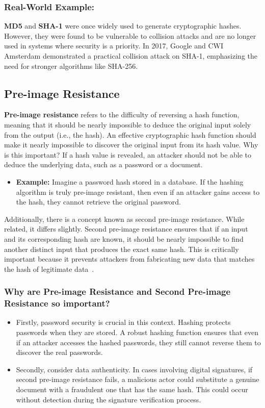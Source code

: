 \documentclass[11pt,a4paper]{article}
\begin{document}
        \subsubsection*{Real-World Example:}
        \textbf{MD5} and \textbf{SHA-1} were once widely used to generate cryptographic hashes. However, they were found to be vulnerable to collision attacks and are no longer used in systems where security is a priority. In 2017, Google and CWI Amsterdam demonstrated a practical collision attack on SHA-1, emphasizing the need for stronger algorithms like SHA-256.
        
    \subsection*{Pre-image Resistance}
    \textbf{Pre-image resistance} refers to the difficulty of reversing a hash function, meaning that it should be nearly impossible to deduce the original input solely from the output (i.e., the hash). An effective cryptographic hash function should make it nearly impossible to discover the original input from its hash value. Why is this important? If a hash value is revealed, an attacker should not be able to deduce the underlying data, such as a password or a document.
        \begin{itemize}
            \item \textbf{Example:} Imagine a password hash stored in a database. If the hashing algorithm is truly pre-image resistant, then even if an attacker gains access to the hash, they cannot retrieve the original password.

        \end{itemize}

    Additionally, there is a concept known as second pre-image resistance. While related, it differs slightly. Second pre-image resistance ensures that if an input and its corresponding hash are known, it should be nearly impossible to find another distinct input that produces the exact same hash. This is critically important because it prevents attackers from fabricating new data that matches the hash of legitimate data~\cite{Preimage}.

        \subsubsection*{Why are Pre-image Resistance and Second Pre-image Resistance so important?}
            \begin{itemize}
                \item Firstly, password security is crucial in this context. Hashing protects passwords when they are stored. A robust hashing function ensures that even if an attacker accesses the hashed passwords, they still cannot reverse them to discover the real passwords.
                \item Secondly, consider data authenticity. In cases involving digital signatures, if second pre-image resistance fails, a malicious actor could substitute a genuine document with a fraudulent one that has the same hash. This could occur without detection during the signature verification process.


            \end{itemize}
\end{document}
